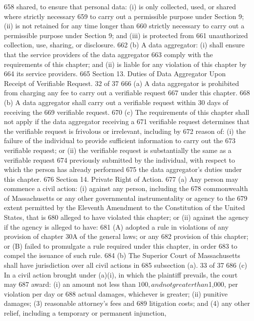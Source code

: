 658 shared, to ensure that personal data: (i) is only collected, used, or shared where strictly necessary
659 to carry out a permissible purpose under Section 9; (ii) is not retained for any time longer than
660 strictly necessary to carry out a permissible purpose under Section 9; and (iii) is protected from
661 unauthorized collection, use, sharing, or disclosure.
662 (b) A data aggregator: (i) shall ensure that the service providers of the data aggregator
663 comply with the requirements of this chapter; and (ii) is liable for any violation of this chapter by
664 its service providers.
665 Section 13. Duties of Data Aggregator Upon Receipt of Verifiable Request.
32 of 37
666 (a) A data aggregator is prohibited from charging any fee to carry out a verifiable request
667 under this chapter.
668 (b) A data aggregator shall carry out a verifiable request within 30 days of receiving the
669 verifiable request.
670 (c) The requirements of this chapter shall not apply if the data aggregator receiving a
671 verifiable request determines that the verifiable request is frivolous or irrelevant, including by
672 reason of: (i) the failure of the individual to provide sufficient information to carry out the
673 verifiable request; or (ii) the verifiable request is substantially the same as a verifiable request
674 previously submitted by the individual, with respect to which the person has already performed
675 the data aggregator’s duties under this chapter.
676 Section 14. Private Right of Action.
677 (a) Any person may commence a civil action: (i) against any person, including the
678 commonwealth of Massachusetts or any other governmental instrumentality or agency to the
679 extent permitted by the Eleventh Amendment to the Constitution of the United States, that is
680 alleged to have violated this chapter; or (ii) against the agency if the agency is alleged to have:
681 (A) adopted a rule in violations of any provision of chapter 30A of the general laws; or any
682 provision of this chapter; or (B) failed to promulgate a rule required under this chapter, in order
683 to compel the issuance of such rule.
684 (b) The Superior Court of Massachusetts shall have jurisdiction over all civil actions in
685 subsection (a).
33 of 37
686 (c) In a civil action brought under (a)(i), in which the plaintiff prevails, the court may
687 award: (i) an amount not less than $100, and not greater than $1,000, per violation per day or
688 actual damages, whichever is greater; (ii) punitive damages; (3) reasonable attorney’s fees and
689 litigation costs; and (4) any other relief, including a temporary or permanent injunction,

